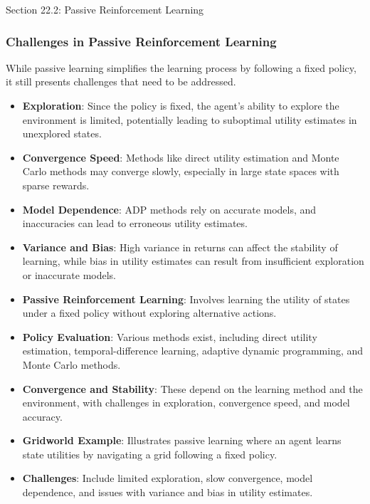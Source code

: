 \begin{notes}{Section 22.2: Passive Reinforcement Learning}
\begin{highlight}
    \end{highlight}
    
    \subsubsection*{Challenges in Passive Reinforcement Learning}
    
    While passive learning simplifies the learning process by following a fixed policy, it still presents challenges that need to be addressed.
    
    \begin{highlight}
    
        \begin{itemize}
            \item \textbf{Exploration}: Since the policy is fixed, the agent's ability to explore the environment is limited, potentially leading to suboptimal utility estimates in unexplored states.
            \item \textbf{Convergence Speed}: Methods like direct utility estimation and Monte Carlo methods may converge slowly, especially in large state spaces with sparse rewards.
            \item \textbf{Model Dependence}: ADP methods rely on accurate models, and inaccuracies can lead to erroneous utility estimates.
            \item \textbf{Variance and Bias}: High variance in returns can affect the stability of learning, while bias in utility estimates can result from insufficient exploration or inaccurate models.
        \end{itemize}
    
    \end{highlight}
    
    \begin{highlight}
    
        \begin{itemize}
            \item \textbf{Passive Reinforcement Learning}: Involves learning the utility of states under a fixed policy without exploring alternative actions.
            \item \textbf{Policy Evaluation}: Various methods exist, including direct utility estimation, temporal-difference learning, adaptive dynamic programming, and Monte Carlo methods.
            \item \textbf{Convergence and Stability}: These depend on the learning method and the environment, with challenges in exploration, convergence speed, and model accuracy.
            \item \textbf{Gridworld Example}: Illustrates passive learning where an agent learns state utilities by navigating a grid following a fixed policy.
            \item \textbf{Challenges}: Include limited exploration, slow convergence, model dependence, and issues with variance and bias in utility estimates.
        \end{itemize}
    

\end{highlight}
\end{notes}
